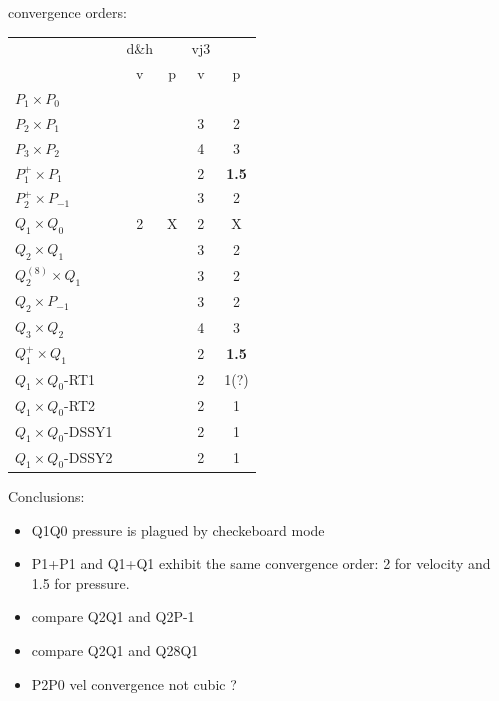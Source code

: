 \newpage
convergence orders:

\begin{center}
\begin{tabular}{l|cc|cc|}
\hline
                     & d\&h &   & vj3 & \\
                     & v    & p & v & p \\
\hline
\hline
$P_1\times P_0$       &      &   &  &   \\
$P_2\times P_1$       &      &   & 3 & 2  \\
$P_3\times P_2$       &      &   & 4 & 3  \\
$P_1^+\times P_{1}$   &      &   & 2 & {\bf 1.5}  \\
$P_2^+\times P_{-1}$  &      &   & 3 & 2  \\
$Q_1\times Q_0$       & 2    & X & 2 & X  \\
$Q_2\times Q_1$       &      &   & 3 & 2  \\
$Q_2^{(8)}\times Q_1$ &      &   & 3 & 2  \\
$Q_2\times P_{-1}$    &      &   & 3 & 2  \\
$Q_3\times Q_2$       &      &   & 4 & 3  \\
$Q_1^+\times Q_1$     &      &   & 2 & {\bf 1.5}  \\
$Q_1\times Q_0$-RT1   &      &   & 2 & 1(?)  \\
$Q_1\times Q_0$-RT2   &      &   & 2 & 1  \\
$Q_1\times Q_0$-DSSY1 &      &   & 2 & 1  \\
$Q_1\times Q_0$-DSSY2 &      &   & 2 & 1  \\
\hline
\end{tabular} 
\end{center}

\vspace{1cm}

Conclusions:
\begin{itemize}
\item Q1Q0 pressure is plagued by checkeboard mode
\item P1+P1 and Q1+Q1 exhibit the same convergence order: 2 for velocity and 1.5 for pressure.
\item compare Q2Q1 and Q2P-1
\item compare Q2Q1 and Q28Q1
\item P2P0 vel convergence not cubic ?
\end{itemize}

\newpage
